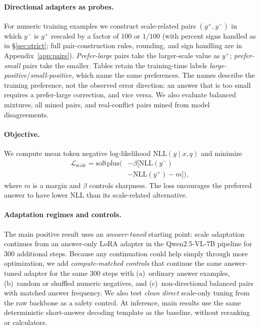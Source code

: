 \paragraph{Directional adapters as probes.}
For numeric training examples we construct scale-related pairs $(y^+,y^-)$ in which $y^-$ is $y^+$ rescaled by a factor of $100$ or $1/100$ (with percent signs handled as in \S\ref{sec:strict}; full pair-construction rules, rounding, and sign handling are in Appendix~\ref{app:pairs}). \emph{Prefer-large} pairs take the larger-scale value as $y^+$; \emph{prefer-small} pairs take the smaller. Tables retain the training-time labels \emph{large-positive}/\emph{small-positive}, which name the same preferences. The names describe the training preference, not the observed error direction: an answer that is too small requires a prefer-large correction, and vice versa. We also evaluate balanced mixtures, all mined pairs, and real-conflict pairs mined from model disagreements.

\paragraph{Objective.}
We compute mean token negative log-likelihood $\mathrm{NLL}(y\mid x,q)$ and minimize
\begin{equation}
\begin{aligned}
\mathcal{L}_{\mathrm{scale}}
=\mathrm{softplus}\big(&-\beta[
\mathrm{NLL}(y^-) \\
&-\mathrm{NLL}(y^+)-m]\big),
\end{aligned}
\end{equation}
where $m$ is a margin and $\beta$ controls sharpness. The loss encourages the preferred answer to have lower NLL than its scale-related alternative.

\paragraph{Adaptation regimes and controls.}
The main positive result uses an \emph{answer-tuned} starting point: scale adaptation continues from an answer-only LoRA adapter in the Qwen2.5-VL-7B pipeline for 300 additional steps. Because any continuation could help simply through more optimization, we add \emph{compute-matched controls} that continue the same answer-tuned adapter for the same 300 steps with (a)~ordinary answer examples, (b)~random or shuffled numeric negatives, and (c)~non-directional balanced pairs with matched answer frequency. We also test \emph{clean direct} scale-only tuning from the raw backbone as a safety control. At inference, main results use the same deterministic short-answer decoding template as the baseline, without reranking or calculators.

